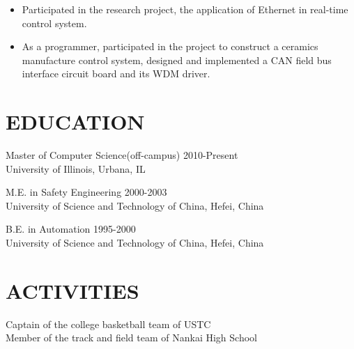\documentclass{res}
\begin{document}
\begin{resume}
                  \begin{itemize}
                  \item Participated in the research project, the application of Ethernet in real-time
                    control system. 
                   \item As a programmer, participated in the project to construct a ceramics
                     manufacture control system, designed and implemented a CAN field bus interface
                     circuit board and its WDM driver.
                   \end{itemize} 
 
\section{EDUCATION} {\sl}
\vspace{0.1in}
                Master of Computer Science(off-campus) \hfill 2010-Present\\
                University of Illinois, Urbana, IL

                M.E. in Safety Engineering \hfill 2000-2003\\
                University of Science and Technology of China, Hefei, China

                B.E. in Automation \hfill 1995-2000\\
                University of Science and Technology of China, Hefei, China
 
\section{ACTIVITIES}
\vspace{0.1in}
                Captain of the college basketball team of USTC\\
                Member of the track and field team of Nankai High School

\end{resume}
\end{document}
